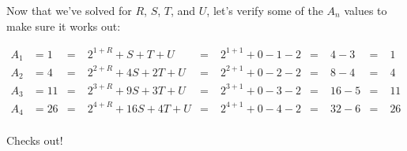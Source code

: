Now that we've solved for $R$, $S$, $T$, and $U$, let's verify some of the
$A_n$ values to make sure it works out:

$$
\begin{aligned}
A_1 & = \boxed{ 1} & = & \; 2^{1 + R} +   S +  T + U & = & \; 2^{1 + 1} + 0 - 1 - 2 & = & \; 4  - 3 & = & \; \boxed{ 1} \\
A_2 & = \boxed{ 4} & = & \; 2^{2 + R} +  4S + 2T + U & = & \; 2^{2 + 1} + 0 - 2 - 2 & = & \; 8  - 4 & = & \; \boxed{ 4} \\
A_3 & = \boxed{11} & = & \; 2^{3 + R} +  9S + 3T + U & = & \; 2^{3 + 1} + 0 - 3 - 2 & = & \; 16 - 5 & = & \; \boxed{11} \\
A_4 & = \boxed{26} & = & \; 2^{4 + R} + 16S + 4T + U & = & \; 2^{4 + 1} + 0 - 4 - 2 & = & \; 32 - 6 & = & \; \boxed{26} \\
\end{aligned}
$$

Checks out!
